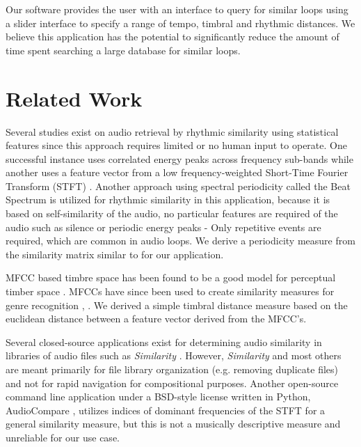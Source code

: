 \documentclass{article}
\begin{document}
Our software provides the user with an interface to query for similar loops using a slider interface to specify a range of tempo, timbral and rhythmic distances. We believe this application has the potential to significantly reduce the amount of time spent searching a large database for similar loops.

\section{Related Work}

Several studies exist on audio retrieval by rhythmic similarity using statistical features since this approach requires limited or no human input to operate. One successful instance uses correlated energy peaks across frequency sub-bands \cite{scheirer1998tempo}  while another uses a feature vector from a low frequency-weighted Short-Time Fourier Transform (STFT) \cite{wold1999classification}. Another approach using spectral periodicity called the Beat Spectrum \cite{foote2001beat} is utilized for rhythmic similarity in this application, because it is based on self-similarity of the audio, no particular features are required of the audio such as silence or periodic energy peaks - Only repetitive events are required, which are common in audio loops. We derive a periodicity measure from the similarity matrix similar to \cite{foote2001beat} for our application.

MFCC based timbre space has been found to be a good model for perceptual timber space \cite{terasawa2005thirteen}. MFCCs have since been used to create similarity measures \cite{jensen2009quantitative} for genre recognition \cite{levy2006lightweight}, \cite{jensen2006evaluation}. We derived a simple timbral distance measure based on the euclidean distance between a feature vector derived from the MFCC's.

Several closed-source applications exist for determining audio similarity in libraries of audio files such as \textit{Similarity} \cite{similarityapp}. However, \textit{Similarity} and most others are meant primarily for file library organization (e.g. removing duplicate files) and not for rapid navigation for compositional purposes. Another open-source command line application under a BSD-style license written in Python, AudioCompare \cite{audiocompare}, utilizes indices of dominant frequencies of the STFT for a general similarity measure, but this is not a musically descriptive measure and unreliable for our use case. 
\end{document}
